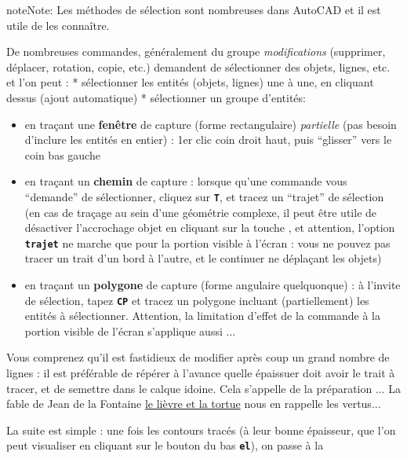 \documentclass[a4paper,12pt,french]{sphinxmanual}
\begin{document}
\begin{notice}{note}{Note:}
Les méthodes de sélection sont nombreuses dans AutoCAD et il est utile de les connaître.

De nombreuses commandes, généralement du groupe \emph{modifications} (supprimer, déplacer, rotation, copie, etc.) demandent de sélectionner des objets, lignes, etc. et l'on peut :
* sélectionner les entités (objets, lignes) une à une, en cliquant dessus (ajout automatique)
* sélectionner un groupe d'entités:
\begin{itemize}
\item {} 
en traçant une \textbf{fenêtre} de capture (forme rectangulaire) \emph{partielle} (pas besoin d'inclure les entités en entier) : 1er clic coin droit haut, puis ``glisser'' vers le coin bas gauche

\item {} 
en traçant un \textbf{chemin} de capture : lorsque qu'une commande vous ``demande'' de sélectionner, cliquez sur \textbf{\texttt{T}}, et tracez un ``trajet'' de sélection (en cas de traçage au sein d'une géométrie complexe, il peut être utile de désactiver l'accrochage objet en cliquant sur la touche , et attention, l'option \textbf{\texttt{trajet}} ne marche que pour la portion visible à l'écran : vous ne pouvez pas tracer un trait d'un bord à l'autre, et le continuer ne déplaçant les objets)

\item {} 
en traçant un \textbf{polygone} de capture (forme angulaire quelquonque) : à l'invite de sélection, tapez \textbf{\texttt{CP}} et tracez un polygone incluant (partiellement) les entités à sélectionner. Attention, la limitation d'effet de la commande à la portion visible de l'écran s'applique aussi ...

\end{itemize}
\end{notice}

Vous comprenez qu'il est fastidieux de modifier après coup un grand nombre de lignes : il est préférable de répérer à l'avance quelle épaissuer doit avoir le trait à tracer, et de semettre dans le calque idoine. Cela s'appelle de la préparation ... La fable de Jean de la Fontaine \href{http://www.leplaisirdapprendre.com/Le-lievre-et-la-tortue.html}{le lièvre et la tortue} nous en rappelle les vertus...

La suite est simple : une fois les contours tracés (à leur bonne épaisseur, que l'on peut visualiser en cliquant sur le bouton du bas \textbf{\texttt{el}}), on passe à la
\end{document}

